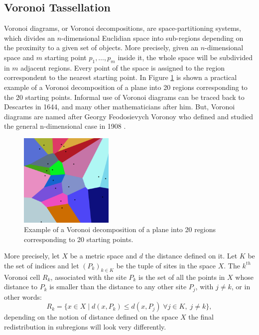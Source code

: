 \subsection{Voronoi Tassellation} \label{ssec:vor_tass}
Voronoi diagrams, or Voronoi decompositions, are space-partitioning systems, which divides an $n$-dimensional Euclidian space into sub-regions depending on the proximity to a given set of objects. More precisely, given an $n$-dimensional space and $m$ starting point $p_1,\dots, p_m$ inside it, the whole space will be subdivided in $m$ adjacent regions. Every point of the space is assigned to the region correspondent to the nearest starting point. In Figure \ref{fig:vor_20} is shown a practical example of a Voronoi decomposition of a plane into 20 regions corresponding to the 20 starting points. Informal use of Voronoi diagrams can be traced back to Descartes in 1644, and many other mathematicians after him. But, Voronoi diagrams are named after Georgy Feodosievych Voronoy who defined and studied the general n-dimensional case in 1908 \cite{VoronoiNouvellesAD}.

\begin{figure}
    \centering
    \includegraphics[width = 0.4\textwidth]{images/vor_20}
    \caption{Example of a Voronoi decomposition of a plane into 20 regions corresponding to 20 starting points.}
    \label{fig:vor_20}
\end{figure}

More precisely, let $X$ be a metric space and $d$ the distance defined on it. Let $K$ be the set of indices and let $(P_k)_{k\in K}$ be the tuple of sites in the space $X$. The $k^{th}$ Voronoi cell $R_k$, associated with the site $P_k$ is the set of all the points in $X$ whose distance to $P_k$ is smaller than the distance to any other site $P_j$, with $j\neq k$, or in other words:
\begin{equation}
    R_k = \{x \in X\;|\;d(x,P_k) \le d(x,P_j)\; \forall j \in K, \;j\neq k \}, \label{eq:formal_Vor_def}
\end{equation}
depending on the notion of distance defined on the space $X$ the final redistribution in subregions will look very differently.

